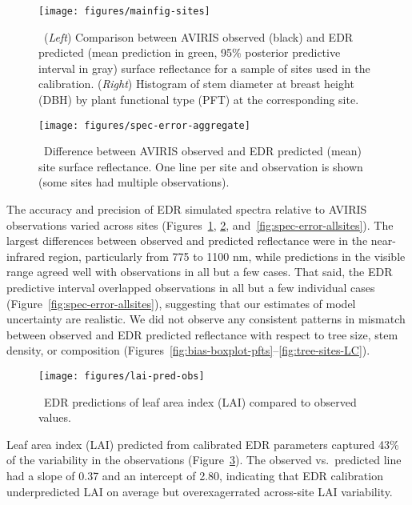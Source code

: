 \begin{figure}
  \centering
  \texttt{[image: figures/mainfig-sites]}
  \caption{\label{fig:spec-error-all}\
    (\emph{Left}) Comparison between AVIRIS observed (black) and
    EDR predicted (mean prediction in green, 95\% posterior predictive interval in gray)
    surface reflectance for a sample of sites used in the calibration.
    (\emph{Right}) Histogram of stem diameter at breast height (DBH) by plant functional type (PFT) at the corresponding site.
  }
\end{figure}

\begin{figure}
  \centering
  \texttt{[image: figures/spec-error-aggregate]}
  \caption{\label{fig:spec-error-aggregate}\
    Difference between AVIRIS observed and EDR predicted (mean) site surface reflectance.
    One line per site and observation is shown (some sites had multiple observations).
  }
\end{figure}

The accuracy and precision of EDR simulated spectra relative to AVIRIS observations varied across sites (Figures~\ref{fig:spec-error-all}, \ref{fig:spec-error-aggregate}, and~\ref{fig:spec-error-allsites}).
The largest differences between observed and predicted reflectance were in the near-infrared region, particularly from 775 to 1100 \unit{nm},
while predictions in the visible range agreed well with observations in all but a few cases.
That said, the EDR predictive interval overlapped observations in all but a few individual cases (Figure~\ref{fig:spec-error-allsites}), suggesting that our estimates of model uncertainty are realistic.
We did not observe any consistent patterns in mismatch between observed and EDR predicted reflectance with respect to tree size, stem density, or composition (Figures~\ref{fig:bias-boxplot-pfts}--\ref{fig:tree-sites-LC}).

\begin{figure}
  \centering
  \texttt{[image: figures/lai-pred-obs]}
  \caption{\
    EDR predictions of leaf area index (LAI) compared to observed values.
  }\label{fig:lai-pred-obs}
\end{figure}

Leaf area index (LAI) predicted from calibrated EDR parameters captured 43\% of the variability in the observations (Figure~\ref{fig:lai-pred-obs}).
The observed vs.\ predicted line had a slope of 0.37 and an intercept of 2.80, indicating that EDR calibration underpredicted LAI on average but overexagerrated across-site LAI variability.
